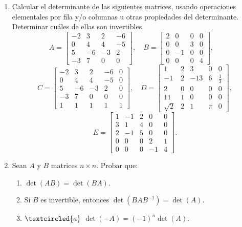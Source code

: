 \begin{enumerate}[topsep=6pt,itemsep=.4cm]
\item Calcular el determinante de las siguientes matrices, usando operaciones elementales por fila y/o columnas u otras propiedades del determinante. Determinar cuáles de ellas son invertibles.
\begin{equation*}
A=
\begin{bmatrix}-2&3&2&-6\\ 0&4&4&-5\\ 5&-6&-3&2\\ -3&7&0&0 \end{bmatrix},\quad
B=\begin{bmatrix} 2&0&0&0\\ 0&0&3&0\\ 0&-1&0&0\\ 0&0&0&4\end{bmatrix},\quad
\end{equation*}
\begin{equation*}
    C=\begin{bmatrix} -2&3&2&-6&0\\ 0&4&4&-5&0\\ 5&-6&-3&2&0\\ -3&7&0&0&0\\ 1&1&1&1&1\end{bmatrix},\quad
D=\begin{bmatrix}1&2&3&0&0\\-1&2&-13&6&\frac{1}{3}\\2&0&0&0&0\\11&1&0&0&0\\\sqrt{2}&2&1&\pi&0\end{bmatrix},
\end{equation*}
\begin{equation*}
E=\begin{bmatrix}1&-1&2&0&0\\ 3&1&4&0&0\\ 2&-1&5&0&0 \\0&0&0&2&1\\ 0&0&0&-1&4    \end{bmatrix}.
\end{equation*}

\item Sean $A$ y  $B$ matrices $n \times n$. Probar que:


\begin{enumerate}
	\item $\det(AB) = \det (BA)$.
	\item Si $B$ es invertible, entonces $\det(B A B^{-1}) = \det (A)$.
	\item\label{-A} $\textcircled{a}$ $\det(-A) = (-1)^n\det (A)$.
\end{enumerate}



\end{enumerate}
